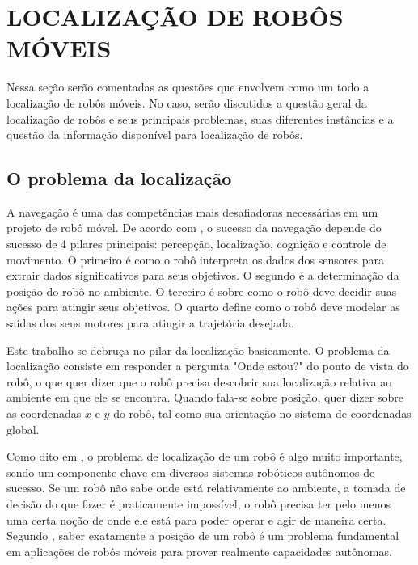 \documentclass[acronym, symbols, table, deposito]{fei}
\begin{document}
	\chapter{LOCALIZAÇÃO DE ROBÔS MÓVEIS}\label{sec:chapter_localizacao_robos_moveis}
	
		Nessa seção serão comentadas as questões que envolvem como um todo a localização de robôs móveis. No caso, serão discutidos a questão geral da localização de robôs e seus principais problemas, suas diferentes instâncias e a questão da informação disponível para localização de robôs.
		
		\section{O problema da localização}
		
			A navegação é uma das competências mais desafiadoras necessárias em um projeto de robô móvel. De acordo com \textcite{siegwart2011introduction}, o sucesso da navegação depende do sucesso de 4 pilares principais: percepção, localização, cognição e controle de movimento. O primeiro é como o robô interpreta os dados dos sensores para extrair dados significativos para seus objetivos. O segundo é a determinação da posição do robô no ambiente. O terceiro é sobre como o robô deve decidir suas ações para atingir seus objetivos. O quarto define como o robô deve modelar as saídas dos seus motores para atingir a trajetória desejada.
			
			Este trabalho se debruça no pilar da localização basicamente. O problema da localização consiste em responder a pergunta "Onde estou?" do ponto de vista do robô, o que quer dizer que o robô precisa descobrir sua localização relativa ao ambiente em que ele se encontra. Quando fala-se sobre posição, quer dizer sobre as coordenadas $x$ e $y$ do robô, tal como sua orientação no sistema de coordenadas global.
			
			Como dito em \textcite{thrun2001robust}, o problema de localização de um robô é algo muito importante, sendo um componente chave em diversos sistemas robóticos autônomos de sucesso. Se um robô não sabe onde está relativamente ao ambiente, a tomada de decisão do que fazer é praticamente impossível, o robô precisa ter pelo menos uma certa noção de onde ele está para poder operar e agir de maneira certa. Segundo \textcite{borenstein1997mobile}, saber exatamente a posição de um robô é um problema fundamental em aplicações de robôs móveis para prover realmente capacidades autônomas.
			
\end{document}
